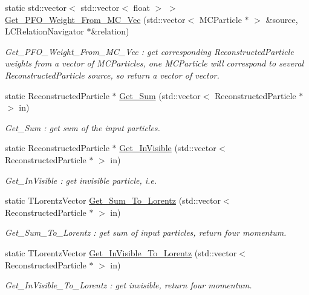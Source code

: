 \begin{DoxyCompactItemize}
static std::vector$<$ std::vector$<$ float $>$ $>$ \hyperlink{classToolSet_1_1CRC_acea8182f9deddac046a49604f3fba50b}{Get\_\-PFO\_\-Weight\_\-From\_\-MC\_\-Vec} (std::vector$<$ MCParticle $\ast$ $>$ \&source, LCRelationNavigator $\ast$\&relation)
\begin{DoxyCompactList}\small\item\em Get\_\-PFO\_\-Weight\_\-From\_\-MC\_\-Vec : get corresponding ReconstructedParticle weights from a vector of MCParticles, one MCParticle will correspond to several ReconstructedParticle source, so return a vector of vector. \item\end{DoxyCompactList}\item 
static ReconstructedParticle $\ast$ \hyperlink{classToolSet_1_1CRC_a466dba941b8cba920e96f28d2d67af1d}{Get\_\-Sum} (std::vector$<$ ReconstructedParticle $\ast$ $>$ in)
\begin{DoxyCompactList}\small\item\em Get\_\-Sum : get sum of the input particles. \item\end{DoxyCompactList}\item 
static ReconstructedParticle $\ast$ \hyperlink{classToolSet_1_1CRC_a09784c243bc4cd8cefb18e00a1d8301f}{Get\_\-InVisible} (std::vector$<$ ReconstructedParticle $\ast$ $>$ in)
\begin{DoxyCompactList}\small\item\em Get\_\-InVisible : get invisible particle, i.e. \item\end{DoxyCompactList}\item 
static TLorentzVector \hyperlink{classToolSet_1_1CRC_a590ec4e3b539f84e18eaaf9053236097}{Get\_\-Sum\_\-To\_\-Lorentz} (std::vector$<$ ReconstructedParticle $\ast$ $>$ in)
\begin{DoxyCompactList}\small\item\em Get\_\-Sum\_\-To\_\-Lorentz : get sum of input particles, return four momentum. \item\end{DoxyCompactList}\item 
static TLorentzVector \hyperlink{classToolSet_1_1CRC_ad244840d5374b1773ed3f822d9411a5d}{Get\_\-InVisible\_\-To\_\-Lorentz} (std::vector$<$ ReconstructedParticle $\ast$ $>$ in)
\begin{DoxyCompactList}\small\item\em Get\_\-InVisible\_\-To\_\-Lorentz : get invisible, return four momentum. \item\end{DoxyCompactList}\item 

\end{DoxyCompactItemize}
